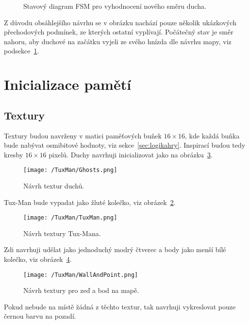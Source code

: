 \documentclass{report}
\begin{document}
\begin{figure}
\begin{center}
\end{center}
\caption{Stavový diagram FSM pro vyhodnocení nového směru ducha.}
\label{fig:ghostfsm}
\end{figure}
Z důvodu obsáhlejšího návrhu se v obrázku nachází pouze několik ukázkových přechodových podmínek, ze kterých ostatní vyplívají. Počátečný stav je směr nahoru, aby duchové na začátku vyjeli ze svého hnízda dle návrhu mapy, viz podsekce~\ref{sec:texturyvehre}.
\section{Inicializace pamětí}\label{sec:texturyvehre}
\subsection{Textury}\label{texturyimpl}
Textury budou navrženy v matici paměťových buňek $16×16$, kde každá buňka bude nabývat osmibitové hodnoty, viz sekce~\ref{sec:logikahry}. Inspirací budou tedy kresby $16×16$ pixelů. Duchy navrhuji inicializovat jako na obrázku~\ref{fig:tuxman}.
\begin{figure}
\centering
\texttt{[image: /TuxMan/Ghosts.png]}
\caption{Návrh textur duchů.}
\label{fig:ghosts}
\end{figure} 
Tux-Man bude vypadat jako žluté kolečko, viz obrázek~\ref{fig:ghosts}.
\begin{figure}
\centering
\texttt{[image: /TuxMan/TuxMan.png]}
\caption{Návrh textury Tux-Mana.}
\label{fig:tuxman}
\end{figure} 
Zdi navrhuji udělat jako jednoduchý modrý čtverec a body jako menší bílé kolečko, viz obrázek~\ref{fig:wallandpoint}.
\begin{figure}
\centering
\texttt{[image: /TuxMan/WallAndPoint.png]}
\caption{Návrh textury pro zeď a bod na mapě.}
\label{fig:wallandpoint}
\end{figure} 
Pokud nebude na místě žádná z těchto textur, tak navrhuji vykreslovat pouze černou barvu na pozadí.
\end{document}
